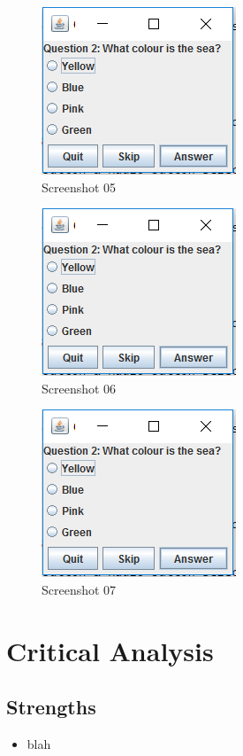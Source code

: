 \documentclass{report}
\begin{document}
    \begin{figure}
        \centering
        \includegraphics{Screenshot05}
        \caption{Screenshot 05}
        \label{fig:screenshot05}
    \end{figure}
    
    \begin{figure}
        \centering
        \includegraphics{Screenshot06}
        \caption{Screenshot 06}
        \label{fig:screenshot06}
    \end{figure}
    
    \begin{figure}
        \centering
        \includegraphics{Screenshot06}
        \caption{Screenshot 07}
        \label{fig:screenshot07}
    \end{figure}
    
    \chapter{Critical Analysis}
        \section{Strengths}
        \begin{itemize}
            \item blah
        \end{itemize}
        
\end{document}
